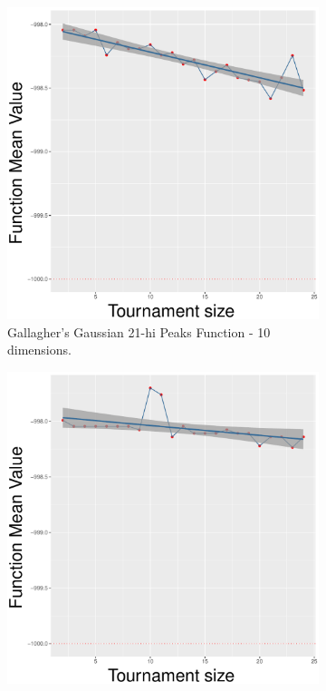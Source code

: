 \begin{figure}[!t]
	\begin{subfigure}[b]{0.33\textwidth}
		\centering
		\includegraphics[width=\textwidth]{img/SBX-10D/multimodal_sbx_22_dim_10.pdf}
		\caption{Gallagher's Gaussian 21-hi Peaks Function - 10 dimensions.}
	\end{subfigure}
	\begin{subfigure}[b]{0.33\textwidth}
		\centering
		\includegraphics[width=\textwidth]{img/SBX-20D/multimodal_sbx_22_dim_20.pdf}

\end{subfigure}
\end{figure}
